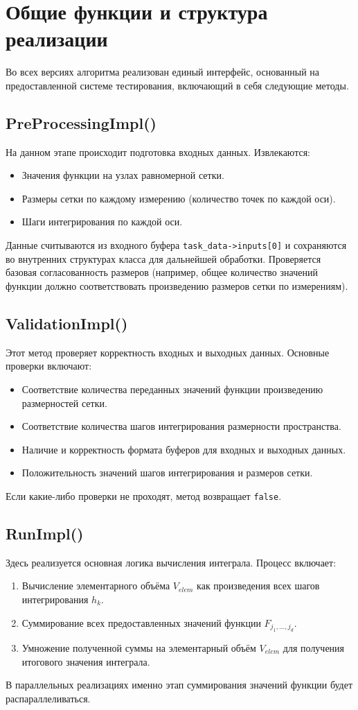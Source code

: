 \documentclass[12pt]{article}
\begin{document}
\section{Общие функции и структура реализации}
Во всех версиях алгоритма реализован единый интерфейс, основанный на предоставленной системе тестирования, включающий в себя следующие методы.

\subsection*{PreProcessingImpl()}
На данном этапе происходит подготовка входных данных. Извлекаются:
\begin{itemize}
    \item Значения функции на узлах равномерной сетки.
    \item Размеры сетки по каждому измерению (количество точек по каждой оси).
    \item Шаги интегрирования по каждой оси.
\end{itemize}
Данные считываются из входного буфера \texttt{task\_data->inputs[0]} и сохраняются во внутренних структурах класса для дальнейшей обработки. Проверяется базовая согласованность размеров (например, общее количество значений функции должно соответствовать произведению размеров сетки по измерениям).

\subsection*{ValidationImpl()}
Этот метод проверяет корректность входных и выходных данных. Основные проверки включают:
\begin{itemize}
    \item Соответствие количества переданных значений функции произведению размерностей сетки.
    \item Соответствие количества шагов интегрирования размерности пространства.
    \item Наличие и корректность формата буферов для входных и выходных данных.
    \item Положительность значений шагов интегрирования и размеров сетки.
\end{itemize}
Если какие-либо проверки не проходят, метод возвращает \texttt{false}.

\subsection*{RunImpl()}
Здесь реализуется основная логика вычисления интеграла. Процесс включает:
\begin{enumerate}
    \item Вычисление элементарного объёма $V_{elem}$ как произведения всех шагов интегрирования $h_k$.
    \item Суммирование всех предоставленных значений функции $F_{j_1, \dots, j_d}$.
    \item Умножение полученной суммы на элементарный объём $V_{elem}$ для получения итогового значения интеграла.
\end{enumerate}
В параллельных реализациях именно этап суммирования значений функции будет распараллеливаться.
\end{document}
